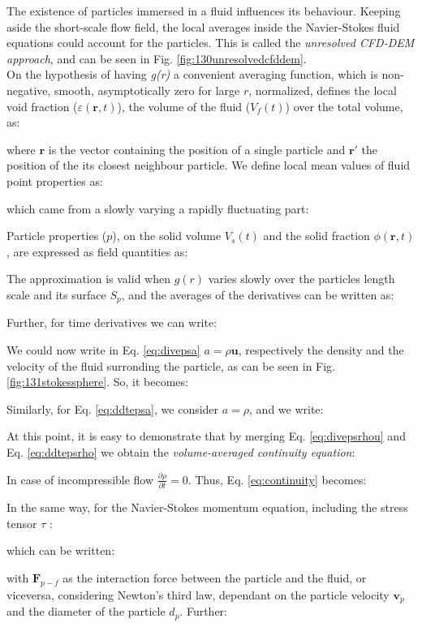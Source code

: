 The existence of particles immersed in a fluid influences its behaviour. 
Keeping aside the short-scale flow field, the local averages inside the
Navier-Stokes fluid equations could account for the particles.
This is called the \textit{unresolved \acs{CFD}-\acs{DEM} approach}, and can be
seen in Fig. \ref{fig:130unresolvedcfddem}.\\

On the hypothesis of having \textit{g(r)} a convenient averaging
function, which is non-negative, smooth, asymptotically zero for large $r$, normalized, \citet{RefWorks:201}
defines the local void fraction ($\varepsilon(\mathbf{r},t)$), the volume of the
fluid ($V_f(t)$) over the total volume, as:

where $\mathbf{r}$ is the vector containing the position of a single particle
and $\mathbf{r'}$ the position of the its closest neighbour particle.
We define local mean values of fluid point properties as:

which came from a slowly varying a rapidly fluctuating part:

Particle properties ($p$), on the solid volume $V_s(t)$ and the solid fraction
$\phi(\mathbf{r},t)$, are expressed as field quantities as:

The approximation is valid when $g(r)$ varies slowly over the particles length
scale and its surface $S_p$, and the averages of the derivatives can be written
as:

Further, for time derivatives we can write:


We could now write in Eq. \ref{eq:divepsa} $a = \rho \mathbf{u}$, respectively
the density and the velocity of the fluid surronding the particle, as can be
seen in Fig. \ref{fig:131stokessphere}. So, it becomes:

Similarly, for Eq. \ref{eq:ddtepsa}, we consider $a = \rho$, and we write:

At this point, it is easy to demonstrate that by merging Eq. \ref{eq:divepsrhou}
and Eq. \ref{eq:ddtepsrho} we obtain the \textit{volume-averaged continuity
equation}:

In case of incompressible flow $\frac{\partial \rho}{\partial t} = 0$. Thus,
Eq.
\ref{eq:continuity} becomes:

In the same way, for the Navier-Stokes momentum equation, including the stress
tensor $\tau$ \cite{Refworks:202}:

which can be written:

with $\mathbf{F}_{p-f}$ as the interaction force between the particle and the
fluid, or viceversa, considering Newton's third law, dependant on the particle
velocity $\mathbf{v}_{p}$ and the diameter of the particle $d_p$. Further:
